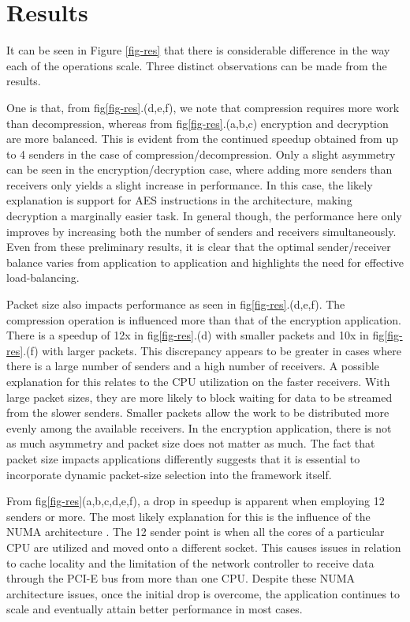 \documentclass[10pt, conference, compsocconf, reqno]{IEEEtran}
\newcommand{\comment}[1]{}
\begin{document}
\section{Results}
\label{results}
It can be seen in Figure \ref{fig-res} that there is considerable difference in the way each of the operations scale. Three distinct observations can be made from the results.

One is that, from fig\ref{fig-res}.(d,e,f), we note that compression requires more work than decompression, whereas from fig\ref{fig-res}.(a,b,c) encryption and decryption are more balanced. This is evident from the continued speedup obtained from up to 4 senders in the case of compression/decompression. Only a slight asymmetry can be seen in the encryption/decryption case, where adding more senders than receivers only yields a slight increase in performance. In this case, the likely explanation is support for AES instructions in the architecture, making decryption a marginally easier task. In general though, the performance here only improves by increasing both the number of senders and receivers simultaneously. Even from these preliminary results, it is clear that the optimal sender/receiver balance varies from application to application and highlights the need for effective load-balancing.

Packet size also impacts performance as seen in fig\ref{fig-res}.(d,e,f). The compression operation is influenced more than that of the encryption application. There is a speedup of 12x in fig\ref{fig-res}.(d) with smaller packets and 10x in fig\ref{fig-res}.(f) with larger packets. This discrepancy appears to be greater in cases where there is a large number of senders and a high number of receivers. A possible explanation for this relates to the CPU utilization on the faster receivers. With large packet sizes, they are more likely to block waiting for data to be streamed from the slower senders. Smaller packets allow the work to be distributed more evenly among the available receivers. In the encryption application, there is not as much asymmetry and packet size does not matter as much. The fact that packet size impacts applications differently suggests that it is essential to incorporate dynamic packet-size selection into the framework itself.\comment{ to respond to the unique requirements of each application.}

From fig\ref{fig-res}(a,b,c,d,e,f), a drop in speedup is apparent when employing 12 senders or more. The most likely explanation for this is the influence of the NUMA architecture \cite{Awasthi:2010:HPO:1854273.1854314}. The 12 sender point is when all the cores of a particular CPU are utilized and moved onto a different socket. This causes issues in relation to cache locality and the limitation of the network controller to receive data through the PCI-E bus from more than one CPU. Despite these NUMA architecture issues, once the initial drop is overcome, the application continues to scale and eventually attain better performance in most cases.
\end{document}
